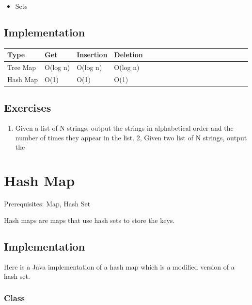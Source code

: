 \documentclass[11pt,oneside]{book}
\begin{document}
\begin{itemize}
\item Sets
\end{itemize}

\subsection{Implementation}

\vspace{10pt} \begin{tabular}{|l|l|l|l|l|l|l|l|l|l|l|l|l|l|l|l|l|l|l}\hline


  Type &
  Get &
  Insertion &
  Deletion\\
\hline


  Tree Map &
  O(log n) &
  O(log n) &
  O(log n)\\

  Hash Map &
  O(1) &
  O(1) &
  O(1)\\

\hline\end{tabular}

\subsection{Exercises}

\begin{enumerate}
\item Given a list of N strings, output the strings in alphabetical order and the number of times they appear in the list.
2, Given two list of N strings, output the 
\end{enumerate}
\section{Hash Map}

Prerequisites: Map, Hash Set



Hash maps are maps that use hash sets to store the keys.

\subsection{Implementation}

Here is a Java implementation of a hash map which is a modified version of a hash set.

\subsubsection{Class}
\end{document}
